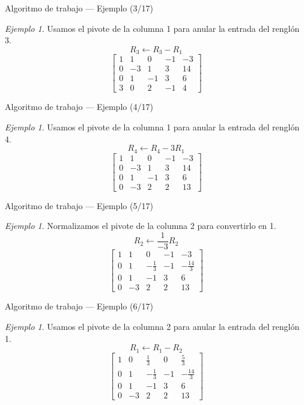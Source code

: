 \documentclass[aspectratio=169,11pt]{beamer}
\theoremstyle{remark}
\newtheorem{Ejem}[definicion]{Ejemplo}
\begin{document}
\begin{frame}{Algoritmo de trabajo — Ejemplo (3/17)}
\begin{Ejem}
Usamos el pivote de la columna 1 para anular la entrada del renglón 3.
\[
R_{3}\leftarrow R_{3}-R_{1}
\]
\[
\left[\begin{array}{cccc|c}
1 & 1 & 0 & -1 & -3\\
0 & -3 & 1 & 3 & 14\\
0 & 1 & -1 & 3 & 6\\
3 & 0 & 2 & -1 & 4
\end{array}\right]
\]
\end{Ejem}
\end{frame}

\begin{frame}{Algoritmo de trabajo — Ejemplo (4/17)}
\begin{Ejem}
Usamos el pivote de la columna 1 para anular la entrada del renglón 4.
\[
R_{4}\leftarrow R_{4}-3R_{1}
\]
\[
\left[\begin{array}{cccc|c}
1 & 1 & 0 & -1 & -3\\
0 & -3 & 1 & 3 & 14\\
0 & 1 & -1 & 3 & 6\\
0 & -3 & 2 & 2 & 13
\end{array}\right]
\]
\end{Ejem}
\end{frame}

\begin{frame}{Algoritmo de trabajo — Ejemplo (5/17)}
\begin{Ejem}
Normalizamos el pivote de la columna 2 para convertirlo en 1.
\[
R_{2}\leftarrow \frac{1}{-3}R_{2}
\]
\[
\left[\begin{array}{cccc|c}
1 & 1 & 0 & -1 & -3\\
0 & 1 & - \frac{1}{3} & -1 & - \frac{14}{3}\\
0 & 1 & -1 & 3 & 6\\
0 & -3 & 2 & 2 & 13
\end{array}\right]
\]
\end{Ejem}
\end{frame}

\begin{frame}{Algoritmo de trabajo — Ejemplo (6/17)}
\begin{Ejem}
Usamos el pivote de la columna 2 para anular la entrada del renglón 1.
\[
R_{1}\leftarrow R_{1}-R_{2}
\]
\[
\left[\begin{array}{cccc|c}
1 & 0 & \frac{1}{3} & 0 & \frac{5}{3}\\
0 & 1 & - \frac{1}{3} & -1 & - \frac{14}{3}\\
0 & 1 & -1 & 3 & 6\\
0 & -3 & 2 & 2 & 13
\end{array}\right]
\]
\end{Ejem}
\end{frame}
\end{document}
